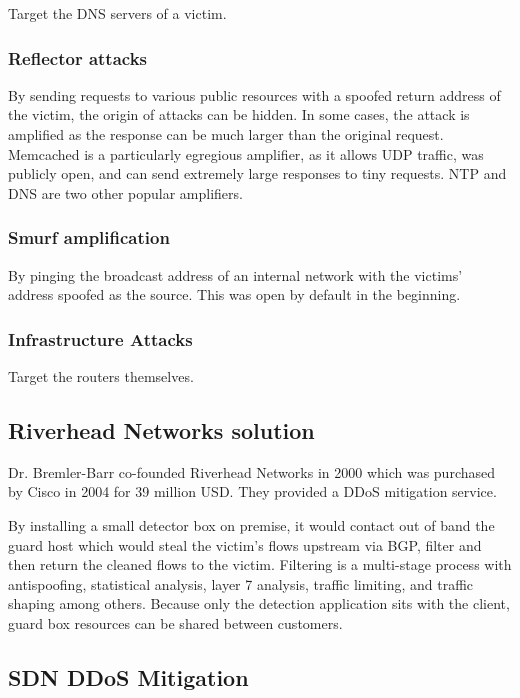 \documentclass{idc_msc}
\begin{document}
Target the DNS servers of a victim.

\subsubsection{Reflector attacks}

By sending requests to various public resources with a spoofed return address of the victim, the origin of attacks can be hidden.
In some cases, the attack is amplified as the response can be much larger than the original request.
Memcached is a particularly egregious amplifier, as it allows UDP traffic, was publicly open, and can send extremely large responses to tiny requests.
NTP and DNS are two other popular amplifiers.

\subsubsection{Smurf amplification}

By pinging the broadcast address of an internal network with the victims' address spoofed as the source.
This was open by default in the beginning.

\subsubsection{Infrastructure Attacks}

Target the routers themselves.

\subsection{Riverhead Networks solution}

Dr. Bremler-Barr co-founded Riverhead Networks in 2000 which was purchased by Cisco in 2004 for 39 million USD.
They provided a DDoS mitigation service.

By installing a small detector box on premise, it would contact out of band the guard host which would steal the victim's flows upstream via BGP, filter and then return the cleaned flows to the victim.
Filtering is a multi-stage process with antispoofing, statistical analysis, layer 7 analysis, traffic limiting, and traffic shaping among others.
Because only the detection application sits with the client, guard box resources can be shared between customers.

\subsection{SDN DDoS Mitigation}
\end{document}
